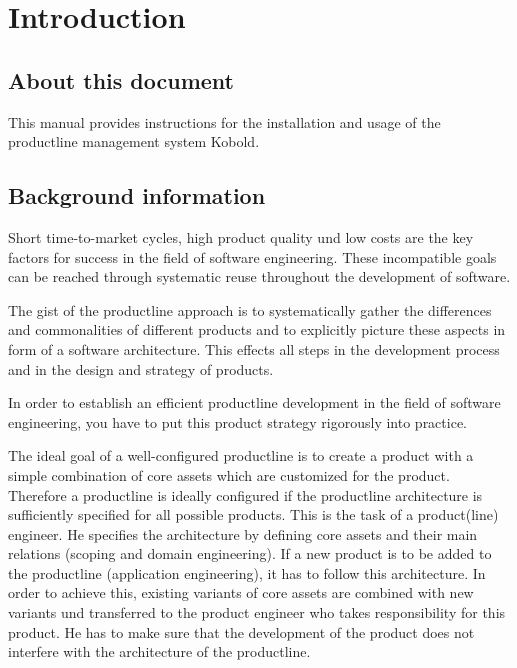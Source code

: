 \chapter{Introduction}

\section{About this document}

This manual provides instructions for the installation and usage of the
productline management system Kobold.

\section{Background information}

Short time-to-market cycles, high product quality und low costs are the 
key factors for success in the field of software engineering. These incompatible 
goals can be reached through systematic reuse throughout the development of
software. \par

The gist of the productline approach is to systematically gather the differences
and commonalities of different products and to explicitly picture these aspects
in form of a software architecture. This effects all steps in the development
process and in the design and strategy of products.\par

In order to establish an efficient productline development in the field of
software engineering, you have to put this product strategy rigorously into
practice.\par

The ideal goal of a well-configured productline is to create a product with a
simple combination of core assets which are customized for the product. Therefore 
a productline is ideally configured if the productline architecture is sufficiently
specified for all possible products. This is the task of a product(line) engineer.
He specifies the architecture by defining core assets and their main relations 
(scoping and domain engineering). If a new product is to be added to the productline 
(application engineering), it has to follow this architecture. In order to achieve
this, existing variants of core assets are combined with new variants und transferred
to the product engineer who takes responsibility for this product. He has to make
sure that the development of the product does not interfere with the architecture
of the productline.\par

